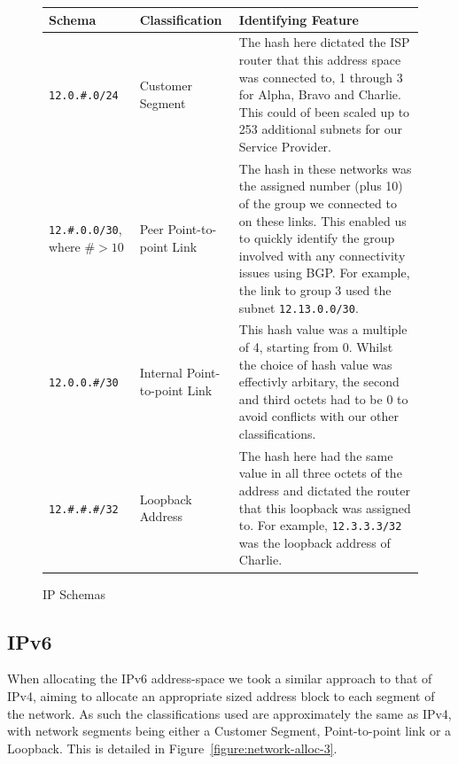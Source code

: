 \begin{figure}[!ht]
    \caption{IP Schemas}
    \label{figure:network-alloc-2}
    \centering
    \begin{tabular}{|p{3cm}|p{3cm}|p{5cm}|}

        \hline
        \textbf{Schema} & \textbf{Classification} & \textbf{Identifying Feature} \\

        \hline
        \texttt{12.0.\#.0/24} & Customer Segment & The hash here dictated the
        ISP router that this address space was connected to, 1 through 3 for
        Alpha, Bravo and Charlie. This could of been scaled up to 253
        additional subnets for our Service Provider.\\
        \hline
        \texttt{12.\#.0.0/30}, where $\#> 10$ & Peer Point-to-point Link &
        The hash in these networks was the assigned number (plus 10) of the group we
        connected to on these links. This enabled us to quickly identify the
        group involved with any connectivity issues using BGP. For example, the
        link to group 3 used the subnet \texttt{12.13.0.0/30}.\\
        \hline
        \texttt{12.0.0.\#/30} & Internal Point-to-point Link &
        This hash value was a multiple of 4, starting from 0. Whilst the choice
        of hash value was effectivly arbitary, the second and third octets had
        to be 0 to avoid conflicts with our other classifications.\\
        \hline
        \texttt{12.\#.\#.\#/32} & Loopback Address & The hash here had
        the same value in all three octets of the address and dictated the
        router that this loopback was assigned to. For example,
        \texttt{12.3.3.3/32} was the loopback address of Charlie.\\

        \hline
    \end{tabular}
\end{figure}

\clearpage

\subsection{IPv6}
When allocating the IPv6 address-space we took a similar approach to that of
IPv4, aiming to allocate an appropriate sized address block to each segment of
the network. As such the classifications used are approximately the same as
IPv4, with network segments being either a Customer Segment, Point-to-point
link or a Loopback. This is detailed in Figure~\ref{figure:network-alloc-3}.

